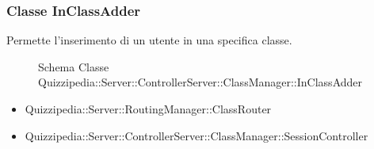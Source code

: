 \subsubsection{Classe InClassAdder}
Permette l'inserimento di un utente in una specifica classe.
\begin{figure}[H]
\centering
\noindent{}
\caption{Schema Classe Quizzipedia::Server::ControllerServer::ClassManager::InClassAdder}
\end{figure}
\begin{itemize}
\item Quizzipedia::Server::RoutingManager::ClassRouter
\end{itemize}
\begin{itemize}
\item Quizzipedia::Server::ControllerServer::ClassManager::SessionController
\end{itemize}
